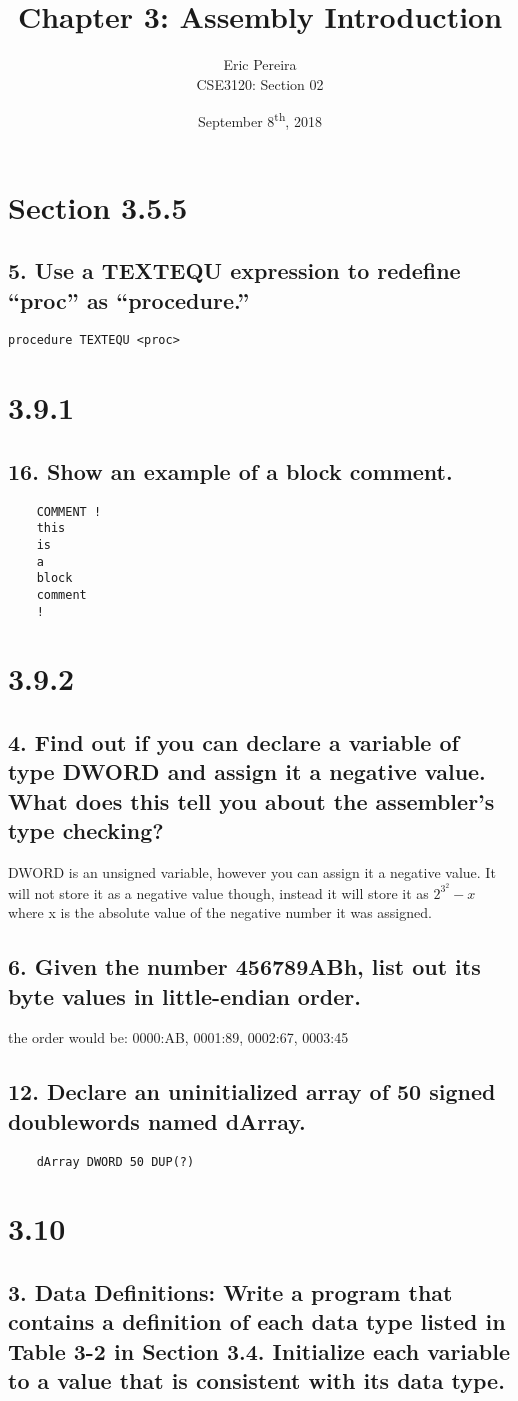 \documentclass[12pt]{article}
\newcommand\tab[1][1cm]{\hspace{#1}}
\begin{document}
\author{Eric Pereira\\
	CSE3120: Section 02}
\date{September 8\textsuperscript{th}, 2018}
\title{Chapter 3: Assembly Introduction}
\maketitle


\section*{Section 3.5.5}
\subsection*{5. Use a TEXTEQU expression to redefine “proc” as “procedure.”}
\begin{lstlisting}
procedure TEXTEQU <proc> 
\end{lstlisting}

\section*{3.9.1}
\subsection*{16. Show an example of a block comment.}
\begin{lstlisting}
	COMMENT ! 
	this
	is
	a
	block
	comment
	!
\end{lstlisting}
\section*{3.9.2}
\subsection*{4. Find out if you can declare a variable of type DWORD and assign it a negative value. What does this tell you about the assembler’s type checking?}
\tab DWORD is an unsigned variable, however you can assign it a negative value. It will not store it as a negative value though, instead it will store it as $2^3^2-x$ where x is the absolute value of the negative number it was assigned.
\subsection*{6. Given the number 456789ABh, list out its byte values in little-endian order.}
\tab the order would be: 0000:AB, 0001:89, 0002:67, 0003:45
\subsection*{12. Declare an uninitialized array of 50 signed doublewords named dArray.}
\begin{lstlisting}
	dArray DWORD 50 DUP(?)
\end{lstlisting}

\section*{3.10}
\subsection*{3. Data Definitions: Write a program that contains a definition of each data type listed in Table 3-2 in Section 3.4. Initialize each variable to a value that is consistent with its data type.}
\end{document}

